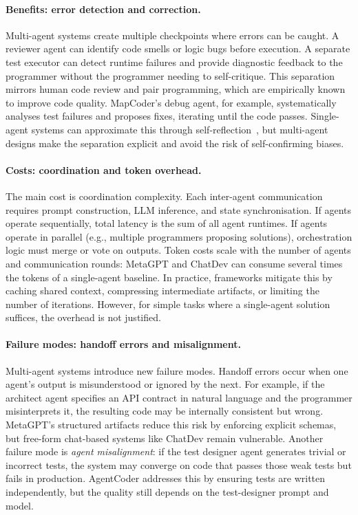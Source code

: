 \paragraph{Benefits: error detection and correction.}
Multi-agent systems create multiple checkpoints where errors can be caught. A
reviewer agent can identify code smells or logic bugs before execution. A
separate test executor can detect runtime failures and provide diagnostic
feedback to the programmer without the programmer needing to self-critique.
This separation mirrors human code review and pair programming, which are
empirically known to improve code quality. MapCoder's debug agent, for example,
systematically analyses test failures and proposes fixes, iterating until the
code passes. Single-agent systems can approximate this through
self-reflection~\cite{madaan2023selfrefine}, but multi-agent designs make the
separation explicit and avoid the risk of self-confirming biases.

\paragraph{Costs: coordination and token overhead.}
The main cost is coordination complexity. Each inter-agent communication
requires prompt construction, LLM inference, and state synchronisation. If
agents operate sequentially, total latency is the sum of all agent runtimes. If
agents operate in parallel (e.g., multiple programmers proposing solutions),
orchestration logic must merge or vote on outputs. Token costs scale with the
number of agents and communication rounds: MetaGPT and ChatDev can consume
several times the tokens of a single-agent baseline. In practice, frameworks
mitigate this by caching shared context, compressing intermediate artifacts, or
limiting the number of iterations. However, for simple tasks where a
single-agent solution suffices, the overhead is not justified.

\paragraph{Failure modes: handoff errors and misalignment.}
Multi-agent systems introduce new failure modes. Handoff errors occur when one
agent's output is misunderstood or ignored by the next. For example, if the
architect agent specifies an API contract in natural language and the
programmer misinterprets it, the resulting code may be internally consistent
but wrong. MetaGPT's structured artifacts reduce this risk by enforcing
explicit schemas, but free-form chat-based systems like ChatDev remain
vulnerable. Another failure mode is \emph{agent misalignment}: if the test
designer agent generates trivial or incorrect tests, the system may converge on
code that passes those weak tests but fails in production. AgentCoder addresses
this by ensuring tests are written independently, but the quality still depends
on the test-designer prompt and model.

